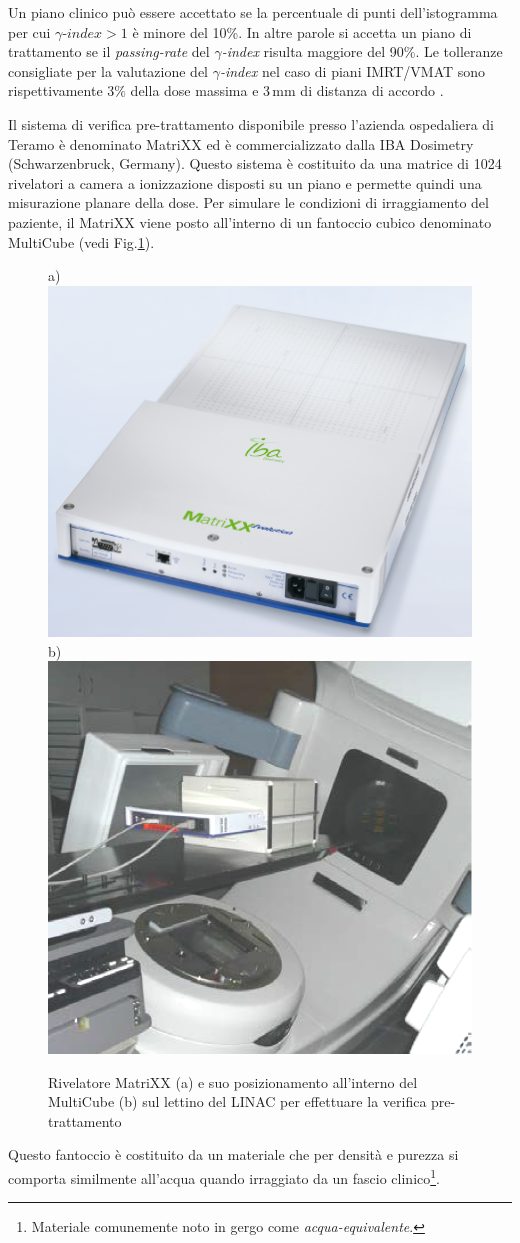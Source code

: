 Un piano clinico può essere accettato se la percentuale di punti dell'istogramma per cui $\gamma\textit{-index} > 1$ è minore del 10\%. In altre parole si accetta un piano di trattamento se il \textit{passing-rate} del $\gamma$\textit{-index} risulta maggiore del 90\%. Le tolleranze consigliate per la valutazione del $\gamma$\textit{-index} nel caso di piani IMRT/VMAT sono rispettivamente $3\%$ della dose massima e $3\,$mm di distanza di accordo \cite{Ezzell2009}.

Il sistema di verifica pre-trattamento disponibile presso l'azienda ospedaliera di Teramo è denominato MatriXX ed è commercializzato dalla IBA Dosimetry (Schwarzenbruck, Germany). Questo sistema è costituito da una matrice di 1024 rivelatori a camera a ionizzazione disposti su un piano e permette quindi una misurazione planare della dose. Per simulare le condizioni di irraggiamento del paziente, il MatriXX viene posto all'interno di un fantoccio cubico denominato MultiCube (vedi Fig.\ref{fig:MatriXX}). 
\begin{figure}
\centering
a)\includegraphics[width=.43\textwidth]{./cap2/MatriXX_Alone.png}
b)\includegraphics[width=.43\textwidth]{./cap2/MatriXX_Cube.png}
\caption{Rivelatore MatriXX (a) e suo posizionamento all'interno del MultiCube (b) sul lettino del LINAC per effettuare la verifica pre-trattamento}
\label{fig:MatriXX}
\end{figure}
Questo fantoccio è costituito da un materiale che per densità e purezza si comporta similmente all'acqua quando irraggiato da un fascio clinico\footnote{Materiale comunemente noto in gergo come \textit{acqua-equivalente}.}. 

